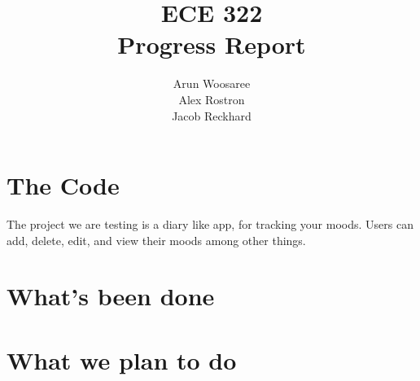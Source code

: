 \documentclass[letterpaper]{article}
\title{ECE 322 \\
Progress Report}
\author{Arun Woosaree\\
        Alex Rostron\\
        Jacob Reckhard}
\begin{document}
\maketitle

\section{The Code}
The project we are testing is a diary like app, for tracking your moods. Users can add, delete, edit, and view their moods among other things.
\section{What's been done}


\section{What we plan to do}



\end{document}
